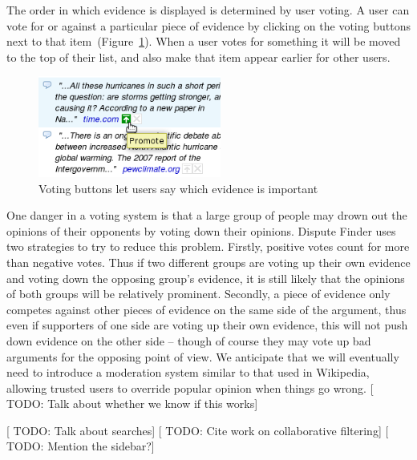 \documentclass{www2010-submission}
\newcommand{\todo}[1]{{[\color{blue} TODO: #1]}}
\begin{document}
The order in which evidence is displayed is determined by user voting. A user can vote for or against a particular piece of evidence by clicking on the voting buttons next to that item~(Figure~\ref{voting}). When a user votes for something it will be moved to the top of their list, and also make that item appear earlier for other users.

\begin{figure}[tb]
	\begin{center}
	\includegraphics[width=6cm]{../screenshots/v2_vote.png}
	\caption{Voting buttons let users say which evidence is important}
	\label{voting}
	\end{center}
\end{figure}


One danger in a voting system is that a large group of people may drown out the opinions of their opponents by voting down their opinions. Dispute Finder uses two strategies to try to reduce this problem. Firstly, positive votes count for more than negative votes. Thus if two different groups are voting up their own evidence and voting down the opposing group's evidence, it is still likely that the opinions of both groups will be relatively prominent. Secondly, a piece of evidence only competes against other pieces of evidence on the same side of the argument, thus even if supporters of one side are voting up their own evidence, this will not push down evidence on the other side -- though of course they may vote up bad arguments for the opposing point of view. We anticipate that we will eventually need to introduce a moderation system similar to that used in Wikipedia, allowing trusted users to override popular opinion when things go wrong. 
\todo{Talk about whether we know if this works}

\todo{Talk about searches}
\todo{Cite work on collaborative filtering}
\todo{Mention the sidebar?}

\end{document}
